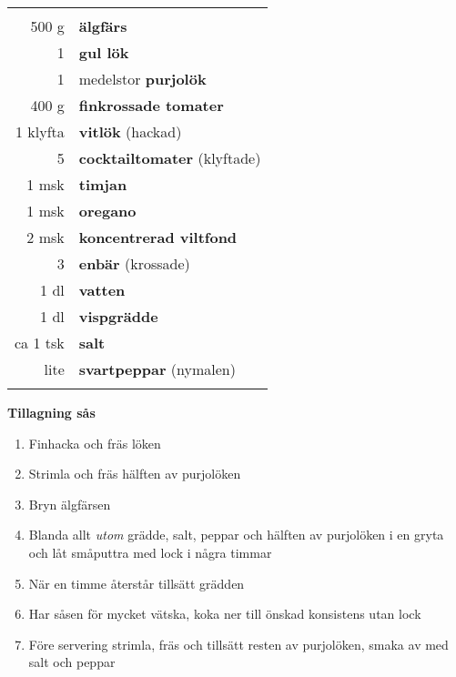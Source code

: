\begin{table}[H]
	\begin{tabular}{rl}
	\hline
	&\\
		500 g & \textbf{älgfärs}\\
		1 & \textbf{gul lök}\\
		1 & medelstor \textbf{purjolök}\\
		400 g & \textbf{finkrossade tomater}\\
		1 klyfta & \textbf{vitlök} (hackad)\\
		5 & \textbf{cocktailtomater} (klyftade)\\
		1 msk & \textbf{timjan}\\
		1 msk & \textbf{oregano}\\
		2 msk & \textbf{koncentrerad viltfond}\\
		3 & \textbf{enbär} (krossade)\\
		1 dl & \textbf{vatten}\\
		1 dl & \textbf{vispgrädde}\\
		ca 1 tsk & \textbf{salt}\\
		lite & \textbf{svartpeppar} (nymalen)\\
	&\\
	\hline
	\end{tabular}
\end{table}


\begin{multicols*}{2}

\noindent \textbf{Tillagning sås}
\begin{enumerate}
	\itemsep0cm
	\item Finhacka och fräs löken
	\item Strimla och fräs hälften av purjo\-löken
	\item Bryn älgfärsen
	\item Blanda allt \textit{utom} grädde, salt, peppar och hälften av purjo\-löken i en gryta och låt små\-puttra med lock i några timmar
	\item När en timme återstår tillsätt grädden
	\item Har såsen för mycket vätska, \mbox{koka} ner till önskad konsistens utan lock
	\item Före servering strimla, fräs och tillsätt resten av purjolöken, smaka av med salt och peppar
\end{enumerate}

\end{multicols*}

\clearpage